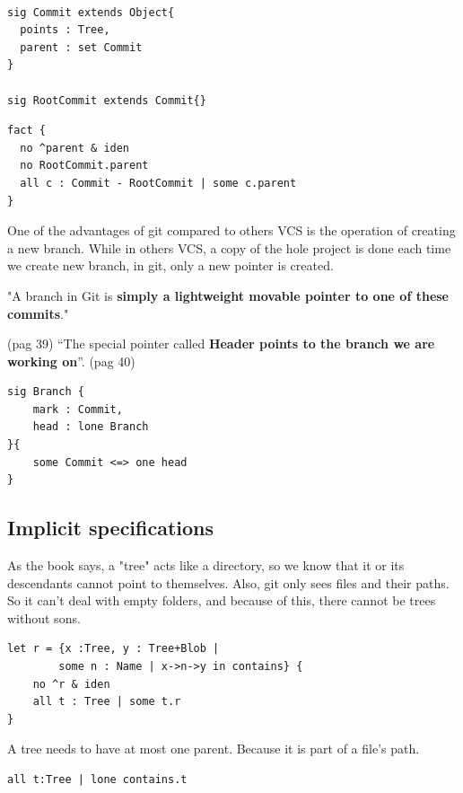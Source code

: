 \begin{lstlisting}

sig Commit extends Object{
  points : Tree,
  parent : set Commit
}

sig RootCommit extends Commit{}

\end{lstlisting}

\begin{lstlisting}
fact {
  no ^parent & iden
  no RootCommit.parent
  all c : Commit - RootCommit | some c.parent	
}

\end{lstlisting}

One of the advantages of git compared to others VCS is the operation
of creating a new branch. While in others VCS, a copy of the hole project is
done each time we create new branch, in git, only a new pointer is created.

"A branch in Git is {\bf simply a 
lightweight movable pointer to one of these commits}." \par \cite{progit} 
(pag 39)
``The special pointer called {\bf Header 
points to the branch we are working on}''. \cite{progit} (pag 40)

\begin{lstlisting}
sig Branch {
	mark : Commit,
	head : lone Branch
}{
	some Commit <=> one head
}
\end{lstlisting}


\subsection{Implicit specifications}

As the book \cite{gitComm} says, a "tree" acts
like a directory, so we know that it or its 
descendants cannot point to themselves.
Also, git only sees files and their paths. So it can't
deal with empty folders, and because of this, there cannot
be trees without sons.

\begin{lstlisting}
let r = {x :Tree, y : Tree+Blob | 
		some n : Name | x->n->y in contains} {
	no ^r & iden
	all t : Tree | some t.r
}
\end{lstlisting}

A tree needs to have at most one parent. Because it is part
of a file's path.
\begin{lstlisting}
all t:Tree | lone contains.t
\end{lstlisting} \par

